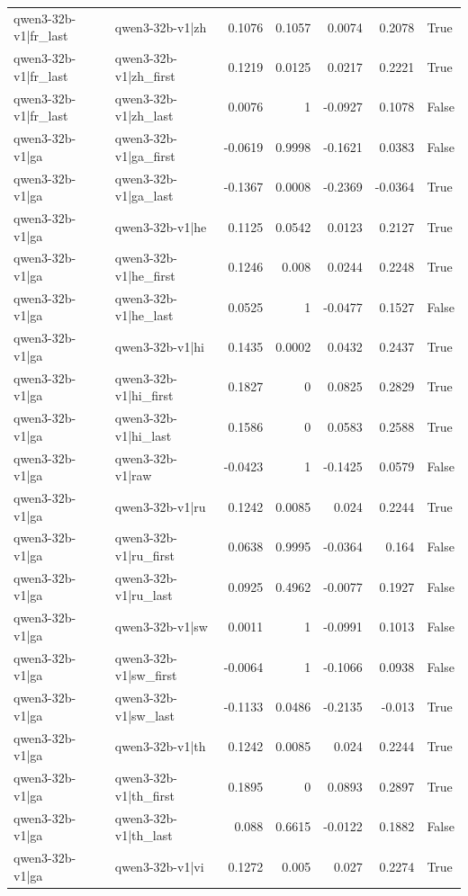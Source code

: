 \begin{table}
\begin{tabular}{l l r r r r l}
qwen3-32b-v1|fr_last & qwen3-32b-v1|zh & 0.1076 & 0.1057 & 0.0074 & 0.2078 & True \\
qwen3-32b-v1|fr_last & qwen3-32b-v1|zh_first & 0.1219 & 0.0125 & 0.0217 & 0.2221 & True \\
qwen3-32b-v1|fr_last & qwen3-32b-v1|zh_last & 0.0076 & 1 & -0.0927 & 0.1078 & False \\
qwen3-32b-v1|ga & qwen3-32b-v1|ga_first & -0.0619 & 0.9998 & -0.1621 & 0.0383 & False \\
qwen3-32b-v1|ga & qwen3-32b-v1|ga_last & -0.1367 & 0.0008 & -0.2369 & -0.0364 & True \\
qwen3-32b-v1|ga & qwen3-32b-v1|he & 0.1125 & 0.0542 & 0.0123 & 0.2127 & True \\
qwen3-32b-v1|ga & qwen3-32b-v1|he_first & 0.1246 & 0.008 & 0.0244 & 0.2248 & True \\
qwen3-32b-v1|ga & qwen3-32b-v1|he_last & 0.0525 & 1 & -0.0477 & 0.1527 & False \\
qwen3-32b-v1|ga & qwen3-32b-v1|hi & 0.1435 & 0.0002 & 0.0432 & 0.2437 & True \\
qwen3-32b-v1|ga & qwen3-32b-v1|hi_first & 0.1827 & 0 & 0.0825 & 0.2829 & True \\
qwen3-32b-v1|ga & qwen3-32b-v1|hi_last & 0.1586 & 0 & 0.0583 & 0.2588 & True \\
qwen3-32b-v1|ga & qwen3-32b-v1|raw & -0.0423 & 1 & -0.1425 & 0.0579 & False \\
qwen3-32b-v1|ga & qwen3-32b-v1|ru & 0.1242 & 0.0085 & 0.024 & 0.2244 & True \\
qwen3-32b-v1|ga & qwen3-32b-v1|ru_first & 0.0638 & 0.9995 & -0.0364 & 0.164 & False \\
qwen3-32b-v1|ga & qwen3-32b-v1|ru_last & 0.0925 & 0.4962 & -0.0077 & 0.1927 & False \\
qwen3-32b-v1|ga & qwen3-32b-v1|sw & 0.0011 & 1 & -0.0991 & 0.1013 & False \\
qwen3-32b-v1|ga & qwen3-32b-v1|sw_first & -0.0064 & 1 & -0.1066 & 0.0938 & False \\
qwen3-32b-v1|ga & qwen3-32b-v1|sw_last & -0.1133 & 0.0486 & -0.2135 & -0.013 & True \\
qwen3-32b-v1|ga & qwen3-32b-v1|th & 0.1242 & 0.0085 & 0.024 & 0.2244 & True \\
qwen3-32b-v1|ga & qwen3-32b-v1|th_first & 0.1895 & 0 & 0.0893 & 0.2897 & True \\
qwen3-32b-v1|ga & qwen3-32b-v1|th_last & 0.088 & 0.6615 & -0.0122 & 0.1882 & False \\
qwen3-32b-v1|ga & qwen3-32b-v1|vi & 0.1272 & 0.005 & 0.027 & 0.2274 & True \\

\end{tabular}
\end{table}
